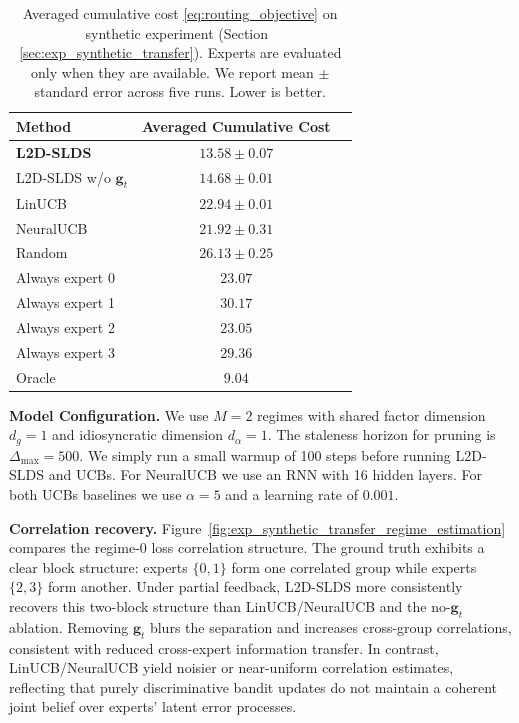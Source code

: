 \begin{table}[ht]
\centering
\small
\setlength{\tabcolsep}{4pt}
\caption{Averaged cumulative cost \eqref{eq:routing_objective} on synthetic experiment (Section~
\ref{sec:exp_synthetic_transfer}). Experts are evaluated only when they are available. We report mean \(\pm\) standard error across five runs. Lower is better.}
\label{tab:exp_avg_costs}
\begin{tabular}{@{}lcc@{}}
\toprule
Method & Averaged Cumulative Cost \\
\midrule
\textbf{L2D-SLDS} & \(\mathbf{13.58 \pm 0.07}\)  \\
L2D-SLDS w/o \(\mathbf{g}_t\) & \(14.68 \pm 0.01\)  \\
\midrule
LinUCB & \(22.94 \pm 0.01\)  \\
NeuralUCB & \(21.92 \pm 0.31\)  \\
Random & \(26.13 \pm 0.25\)   \\
Always expert 0 & \(23.07\)  \\
Always expert 1 & \(30.17\)  \\
Always expert 2 & \(23.05\)  \\
Always expert 3 & \(29.36\)  \\
Oracle & \(9.04\)\\
\bottomrule
\end{tabular}
\end{table}

\textbf{Model Configuration.}
We use $M = 2$ regimes with shared factor dimension $d_g = 1$ and idiosyncratic dimension $d_\alpha = 1$.
The staleness horizon for pruning is $\Delta_{\max} = 500$. We simply run a small warmup of 100 steps before
running L2D-SLDS and UCBs. For NeuralUCB we use an RNN with 16 hidden layers. For both UCBs baselines we use
$\alpha=5$ and a learning rate of $0.001$.



\textbf{Correlation recovery.}
Figure~\ref{fig:exp_synthetic_transfer_regime_estimation} compares the regime-0 loss correlation
structure. The ground truth exhibits a clear block structure: experts \(\{0,1\}\)
form one correlated group while experts \(\{2,3\}\) form another.
Under partial feedback, L2D-SLDS more consistently recovers this two-block structure than
LinUCB/NeuralUCB and the no-\(\mathbf{g}_t\) ablation. Removing \(\mathbf{g}_t\) blurs the separation
and increases cross-group correlations, consistent with reduced cross-expert information transfer.
In contrast, LinUCB/NeuralUCB yield noisier or near-uniform correlation estimates, reflecting that
purely discriminative bandit updates do not maintain a coherent joint belief over experts' latent
error processes.

